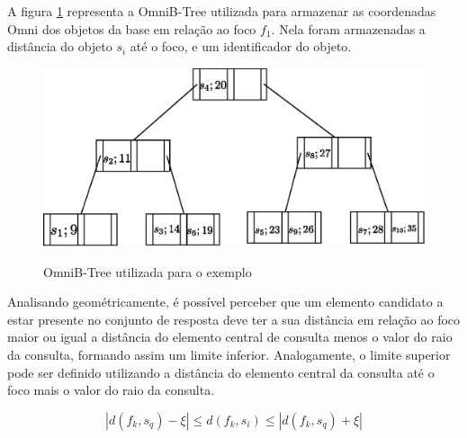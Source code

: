 A figura \ref{fig:btree} representa a OmniB-Tree utilizada para armazenar as coordenadas Omni dos objetos da base em relação ao foco $f_1$. Nela foram armazenadas
a distância do objeto $s_i$ até o foco, e um identificador do objeto.

\begin{figure}[H]
\centering
\caption{OmniB-Tree utilizada para o exemplo}
\includegraphics[width=.8\textwidth]{dados/figuras/btree.eps}
\label{fig:btree}
\end{figure}

Analisando geométricamente, é possível perceber que um elemento candidato a estar presente no conjunto de resposta deve ter a sua distância em relação ao foco maior ou igual a distância do elemento central de consulta menos o valor do
raio da consulta, formando assim um limite inferior. Analogamente, o limite superior pode ser definido utilizando a distância do elemento central da consulta até o foco mais o valor do raio da consulta.

\begin{equation} \label{eq:omnirq}
|d(f_k, s_q) - \xi| \leq d(f_k, s_i) \leq |d(f_k, s_q) + \xi|
\end{equation}

